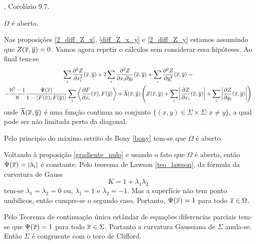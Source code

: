 \begin{demonstracao}
	\cite{Brendle2010}, Corolário 9.7.
\end{demonstracao}

\begin{proposicao}
	$\Omega$ é aberto.
\end{proposicao}

\begin{demonstracao}
	Nas proposições \ref{2_diff_Z_x}, \ref{diff_Z_x_y} e \ref{2_diff_Z_y} estamos assumindo que $Z(\overline{x},\overline{y}) = 0$. Vamos agora repetir o cálculos sem considerar essa hipóteses. Ao final tem-se
	\begin{multline*}
	\sum_i \frac{\partial^2 Z}{\partial x_i^2}(\overline{x},\overline{y}) + 2 \sum_i \frac{\partial^2 Z}{\partial x_i \partial y_i}(\overline{x},\overline{y}) + \sum_i \frac{\partial^2 Z}{\partial y_i^2}(\overline{x},\overline{y}) =\\
	- \frac{\aleph^2 - 1}{\aleph} \frac{\Psi(\overline{x})}{1 - \langle F(\overline{x}), F(\overline{y}) \rangle} \sum_i \left\langle \frac{\partial F}{\partial x_i}(\overline{x}), F(\overline{y}) \right\rangle + \overline{\Lambda}(\overline{x},\overline{y}) \left( Z(\overline{x},\overline{y}) + \sum_i \left| \frac{\partial Z}{\partial x_i}(\overline{x},\overline{y}) \right| + \sum_i \left| \frac{\partial Z}{\partial y_i}(\overline{x},\overline{y}) \right| \right)
	\end{multline*}
	onde $\overline{\Lambda}(\overline{x},\overline{y})$ é uma função continua no conjunto $\{ (x,y) \in \Sigma \times \Sigma: x \neq y \}$, a qual pode ser não limitada perto da diagonal.
	
	Pelo principio do máximo estrito de Bony \ref{bony} tem-se que $\Omega$ é aberto.
\end{demonstracao}

Voltando à proposição \ref{gradiente_nulo} e usando o fato que $\Omega$ é aberto, então $\Psi(\overline{x})= |\lambda_i|$ é constante. Pelo teorema de Lawson \ref{teo_lawson}, da fórmula da curvatura de Gauss
\begin{equation*}
	K = 1 + \lambda_1 \lambda_2
\end{equation*}
tem-se $\lambda_1 = \lambda_2 = 0$ ou, $\lambda_1 = 1$ e $\lambda_2=-1$. Mas a superfície não tem ponto umbílicos, então cumpre-se o segundo caso. Portanto, $\Psi(\overline{x})=1$ para todo $\overline{x} \in \Omega$.
	
Pelo Teorema de continuação única estândar de equações diferencias parciais \cite{Aronszajn1957} tem-se que $\Psi(\overline{x}) = 1$ para todo $\overline{x} \in \Sigma$. Portanto a curvatura Gaussiana de $\Sigma$ anula-se. Então $\Sigma$ é congruente com o toro de Clifford.
